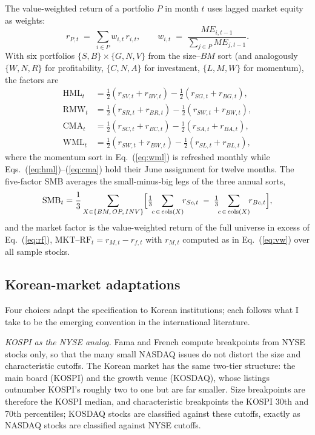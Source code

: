 \documentclass[11pt]{article}
\begin{document}
The value-weighted return of a portfolio $P$ in month $t$ uses lagged market equity as weights:
\begin{equation}
r_{P,t} \;=\; \sum_{i \in P} w_{i,t}\, r_{i,t}, \qquad
w_{i,t} \;=\; \frac{ME_{i,t-1}}{\sum_{j \in P} ME_{j,t-1}}.
\label{eq:vw}
\end{equation}
With six portfolios $\{S,B\}\times\{G,N,V\}$ from the size--$BM$ sort (and analogously $\{W,N,R\}$ for profitability, $\{C,N,A\}$ for investment, $\{L,M,W\}$ for momentum), the factors are
\begin{align}
\mathrm{HML}_t &= \tfrac{1}{2}(r_{SV,t}+r_{BV,t}) - \tfrac{1}{2}(r_{SG,t}+r_{BG,t}), \label{eq:hml}\\
\mathrm{RMW}_t &= \tfrac{1}{2}(r_{SR,t}+r_{BR,t}) - \tfrac{1}{2}(r_{SW,t}+r_{BW,t}), \label{eq:rmw}\\
\mathrm{CMA}_t &= \tfrac{1}{2}(r_{SC,t}+r_{BC,t}) - \tfrac{1}{2}(r_{SA,t}+r_{BA,t}), \label{eq:cma}\\
\mathrm{WML}_t &= \tfrac{1}{2}(r_{SW,t}+r_{BW,t}) - \tfrac{1}{2}(r_{SL,t}+r_{BL,t}), \label{eq:wml}
\end{align}
where the momentum sort in Eq.~(\ref{eq:wml}) is refreshed monthly while Eqs.~(\ref{eq:hml})--(\ref{eq:cma}) hold their June assignment for twelve months. The five-factor SMB averages the small-minus-big legs of the three annual sorts,
\begin{equation}
\mathrm{SMB}_t = \frac{1}{3}\sum_{X \in \{BM,\,OP,\,INV\}} \Bigl[ \tfrac{1}{3}\!\!\sum_{c\,\in\,\text{cols}(X)}\!\! r_{S c,t} \;-\; \tfrac{1}{3}\!\!\sum_{c\,\in\,\text{cols}(X)}\!\! r_{B c,t} \Bigr],
\label{eq:smb}
\end{equation}
and the market factor is the value-weighted return of the full universe in excess of Eq.~(\ref{eq:rf}), $\mathrm{MKT\text{--}RF}_t = r_{M,t} - r_{f,t}$ with $r_{M,t}$ computed as in Eq.~(\ref{eq:vw}) over all sample stocks.

\subsection{Korean-market adaptations}

Four choices adapt the specification to Korean institutions; each follows what I take to be the emerging convention in the international literature.

\emph{KOSPI as the NYSE analog.} Fama and French compute breakpoints from NYSE stocks only, so that the many small NASDAQ issues do not distort the size and characteristic cutoffs. The Korean market has the same two-tier structure: the main board (KOSPI) and the growth venue (KOSDAQ), whose listings outnumber KOSPI's roughly two to one but are far smaller. Size breakpoints are therefore the KOSPI median, and characteristic breakpoints the KOSPI 30th and 70th percentiles; KOSDAQ stocks are classified against these cutoffs, exactly as NASDAQ stocks are classified against NYSE cutoffs.
\end{document}
